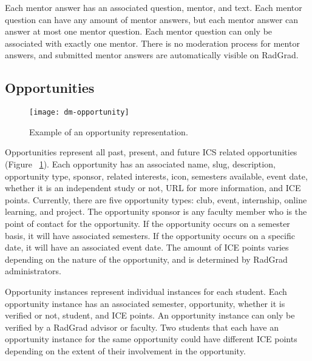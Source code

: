 Each mentor answer has an associated question, mentor, and text. Each mentor question can have any amount of mentor answers, but each mentor answer can answer at most one mentor question. Each mentor question can only be associated with exactly one mentor. There is no moderation process for mentor answers, and submitted mentor answers are automatically visible on RadGrad. 

\subsection{Opportunities}
\begin{figure}[htbp!]
\centering
\texttt{[image: dm-opportunity]}
\caption{Example of an opportunity representation.}
\label{opportunity}
\end{figure}
Opportunities represent all past, present, and future ICS related opportunities (Figure ~\ref{opportunity}).  Each opportunity has an associated name, slug, description, opportunity type, sponsor, related interests, icon, semesters available, event date, whether it is an independent study or not, URL for more information, and ICE points. Currently, there are five opportunity types: club, event, internship, online learning, and project. The opportunity sponsor is any faculty member who is the point of contact for the opportunity. If the opportunity occurs on a semester basis, it will have associated semesters. If the opportunity occurs on a specific date, it will have an associated event date. The amount of ICE points varies depending on the nature of the opportunity, and is determined by RadGrad administrators. 

Opportunity instances represent individual instances for each student. Each opportunity instance has an associated semester, opportunity, whether it is verified or not, student, and ICE points. An opportunity instance can only be verified by a RadGrad advisor or faculty. Two students that each have an opportunity instance for the same opportunity could have different ICE points depending on the extent of their involvement in the opportunity.    

